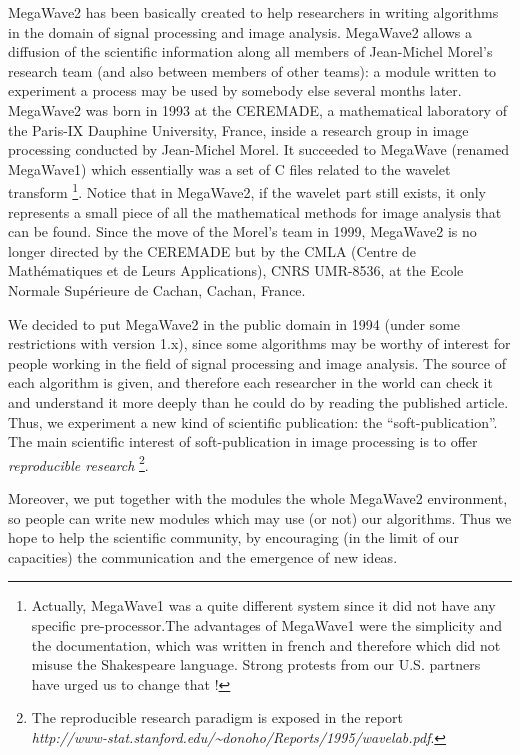 MegaWave2 has been basically created to help researchers in writing algorithms in the domain of signal processing and 
image analysis.
MegaWave2 allows a diffusion of the scientific information along all members of Jean-Michel Morel's research team (and also between
members of other teams): a module written to experiment a process may be used by somebody else several 
months later.
MegaWave2 was born in 1993 at the CEREMADE, a mathematical laboratory of the Paris-IX Dauphine University,
France, inside a research group in image processing conducted by Jean-Michel Morel.
It succeeded to MegaWave (renamed MegaWave1) which essentially was a set of C files related to
the wavelet transform \footnote{Actually, MegaWave1 was a quite different system since it did not have any specific 
pre-processor.The advantages of MegaWave1 were the simplicity and the documentation, which was written in french and 
therefore which did not misuse the Shakespeare language. Strong protests from our U.S. partners have urged us to change 
that !}.
Notice that in MegaWave2, if the wavelet part still exists, it only represents a small piece of all
the mathematical methods for image analysis that can be found. 
Since the move of the Morel's team in 1999, MegaWave2 is no longer directed by the CEREMADE but by the CMLA (Centre de Math\'ematiques et de 
Leurs Applications), CNRS UMR-8536, at the Ecole Normale Sup\'erieure de Cachan, Cachan, France.

We decided to put MegaWave2 in the public domain in 1994 (under some restrictions with version 1.x), since some 
algorithms may be worthy of interest for people working in the field of signal processing and image analysis.
The source of each algorithm is given, and therefore each researcher in the world can check it and understand it more deeply than he could do by reading the published article.
Thus, we experiment a new kind of scientific publication: the ``soft-publication''.
The main scientific interest of soft-publication in image processing is to offer {\em reproducible research}
\footnote{The reproducible research paradigm is exposed in the report\\
{\em http://www-stat.stanford.edu/\~{}donoho/Reports/1995/wavelab.pdf}.}.

Moreover, we put together with the modules the whole MegaWave2 environment, so people can write new modules which may use 
(or not) our algorithms.
Thus we hope to help the scientific community, by encouraging (in the limit of our capacities) the communication and the 
emergence of new ideas.

